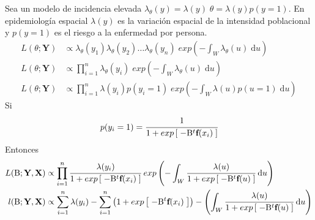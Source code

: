 \documentclass[12pt,a4paper,oneside]{report}
\begin{document}
Sea un modelo de incidencia elevada $\lambda_\theta(y) = \lambda(y) \; \theta = \lambda(y) p(y=1)$. En epidemiología espacial $\lambda(y)$ es la variación espacial de la intensidad poblacional y $p(y=1)$ es el riesgo a la enfermedad por persona.
\begin{align*}
L(\theta; \textbf{Y}) &\propto \lambda_\theta(y_1) \lambda_\theta(y_2) \dots \lambda_\theta(y_n) \; exp\left( - \int_W \lambda_\theta(u) \; \mathrm{d} u \right) \\
L(\theta; \textbf{Y}) &\propto \prod_{i=1}^n \lambda_\theta(y_i)  \; exp\left( - \int_W \lambda_\theta(u) \; \mathrm{d} u \right) \\
L(\theta; \textbf{Y}) &\propto \prod_{i=1}^n \lambda(y_i) p(y_i=1)  \; exp\left( - \int_W \lambda(u) p(u=1) \; \mathrm{d} u \right)
\end{align*}
Si
\begin{equation*}
    p(y_i=1) = \cfrac{1}{1+exp\left[\; -\mathrm{B}^t \textbf{f} (x_i) \; \right]}
\end{equation*}
Entonces
\begin{align*}
L(\mathrm{B}; \textbf{Y},\textbf{X}) &\propto \prod_{i=1}^n \cfrac{\lambda(y_i)} {1+exp\left[\; -\mathrm{B}^t \textbf{f} (x_i) \; \right]} \; exp\left( - \int_W \cfrac{\lambda(u)}{1+exp\left[\; -\mathrm{B}^t \textbf{f} (u) \; \right]} \; \mathrm{d} u \right) \\
l(\mathrm{B}; \textbf{Y},\textbf{X}) &\propto \sum_{i=1}^n \lambda(y_i) - \sum_{i=1}^n \left( 1+exp\left[\; -\mathrm{B}^t \textbf{f} (x_i) \; \right] \right) - \left( \int_W \cfrac{\lambda(u)}{1+exp\left[\; -\mathrm{B}^t \textbf{f} (u) \; \right]} \; \mathrm{d} u \right)
\end{align*}


\end{document}
